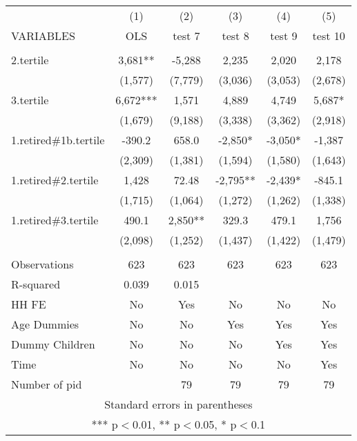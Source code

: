 \begin{tabular}{lccccc} \hline
 & (1) & (2) & (3) & (4) & (5) \\
VARIABLES & OLS & test 7 & test 8 & test 9 & test 10 \\ \hline
 &  &  &  &  &  \\
2.tertile & 3,681** & -5,288 & 2,235 & 2,020 & 2,178 \\
 & (1,577) & (7,779) & (3,036) & (3,053) & (2,678) \\
3.tertile & 6,672*** & 1,571 & 4,889 & 4,749 & 5,687* \\
 & (1,679) & (9,188) & (3,338) & (3,362) & (2,918) \\
1.retired\#1b.tertile & -390.2 & 658.0 & -2,850* & -3,050* & -1,387 \\
 & (2,309) & (1,381) & (1,594) & (1,580) & (1,643) \\
1.retired\#2.tertile & 1,428 & 72.48 & -2,795** & -2,439* & -845.1 \\
 & (1,715) & (1,064) & (1,272) & (1,262) & (1,338) \\
1.retired\#3.tertile & 490.1 & 2,850** & 329.3 & 479.1 & 1,756 \\
 & (2,098) & (1,252) & (1,437) & (1,422) & (1,479) \\
 &  &  &  &  &  \\
Observations & 623 & 623 & 623 & 623 & 623 \\
R-squared & 0.039 & 0.015 &  &  &  \\
HH FE & No & Yes & No & No & No \\
Age Dummies & No & No & Yes & Yes & Yes \\
Dummy Children & No & No & No & Yes & Yes \\
Time & No & No & No & No & Yes \\
 Number of pid &  & 79 & 79 & 79 & 79 \\ \hline
\multicolumn{6}{c}{ Standard errors in parentheses} \\
\multicolumn{6}{c}{ *** p$<$0.01, ** p$<$0.05, * p$<$0.1} \\
\end{tabular}
